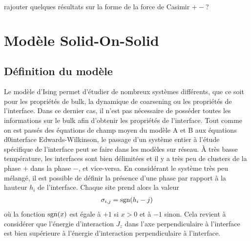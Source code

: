 {\color{red} rajouter quelques résultats sur la forme de la force de Casimir $+-$? }

    \section{Modèle Solid-On-Solid}
    \subsection{Définition du modèle}
Le modèle d'Ising permet d'étudier de nombreux systèmes différents, que ce soit pour les propriétés de bulk, la dynamique de coarsening ou les propriétés de l'interface. Dans ce dernier cas, il n'est pas nécessaire de posséder toutes les informations sur le bulk afin d'obtenir les propriétés de l'interface. 
Tout comme on est passés des équations de champ moyen du modèle A et B aux équations d0interface Edwards-Wilkinson, le passage d'un système entier à l'étude spécifique de l'interface peut se faire dans les modèles sur réseau.
À très basse température, les interfaces sont bien délimitées et il y a très peu de clusters de la phase $+$ dans la phase $-$, et vice-versa. En considérant le système très peu mélangé, il est possible de définir la présence d'une phase par rapport à la hauteur $h_i$ de l'interface. Chaque site prend alors la valeur
\begin{align*}
	\sigma_{i,j} = \operatorname{sgn}(h_i-j)
\end{align*}
où la fonction $\operatorname{sgn}(x)$ est égale à $+1$ si $x >0$ et à $-1$ sinon. Cela revient à considérer que l'énergie d'interaction $J_z$ dans l'axe perpendiculaire à l'interface est bien supérieure à l'énergie d'interaction perpendiculaire à l'interface.

